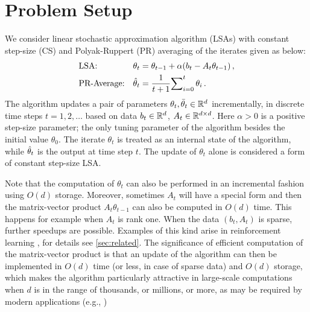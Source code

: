 \section{Problem Setup}\label{sec:prob}
We consider linear stochastic approximation algorithm (LSAs) with constant step-size (CS) and Polyak-Ruppert (PR) averaging of the iterates given as below:
\begin{subequations}\label{eq:lsa}
\begin{align}
\label{conststep}&\text{LSA:} &\theta_t&=\theta_{t-1}+\alpha(b_t-A_t\theta_{t-1})\,,\\
\label{iteravg}&\text{PR-Average:} &\hat{\theta}_t&=\frac{1}{t+1}{\sum}_{i=0}^{t}\,\theta_i\,.
\end{align}
\end{subequations}
The algorithm updates a pair of parameters $\theta_t,\bar{\theta}_t\in \mathbb{R}^{d}$ incrementally, in discrete time steps $t=1,2,\dots$
based on data $b_t\in \mathbb{R}^d$, $A_t\in \mathbb{R}^{d \times d}$. Here $\alpha>0$ is a positive step-size parameter; the only tuning parameter of the algorithm besides the
initial value $\theta_0$. The iterate $\theta_t$ is treated as an internal state of the algorithm, while $\hat{\theta}_t$ is the output at time step $t$. The update of $\theta_t$ alone is considered a form of constant step-size LSA.

Note that the computation of $\theta_t$ can also be performed in an incremental fashion using $O(d)$ storage. 
Moreover, sometimes $A_t$ will have a special form and then the matrix-vector product $A_t \theta_{t-1}$ can also be computed in $O(d)$ time. This happens for example when $A_t$ is rank one.
When the data $(b_t,A_t)$ is sparse, further speedups are possible.
Examples of this kind arise in reinforcement learning \cite{sutton,konda-tsitsiklis,gtd,gtd2,gtdmp}, 
for details see \cref{sec:related}.
The significance of efficient computation of the matrix-vector product is that an update of the algorithm
can then be implemented in $O(d)$ time (or less, in case of sparse data) and $O(d)$ storage, which makes the algorithm particularly attractive in large-scale computations when $d$ is in the range of thousands, or millions, or more, as may be required by modern applications (e.g., \citep{LiMaTaBo16})

